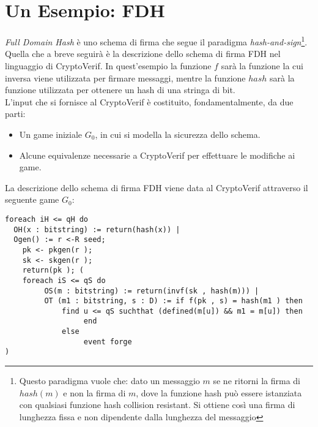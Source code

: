 \documentclass[a4paper,openright,twoside,12pt]{report}
\begin{document}
\section{Un Esempio: FDH}
\emph{Full Domain Hash} \`e uno schema di firma che segue il paradigma \emph{hash-and-sign}\footnote{Questo paradigma vuole che: dato un messaggio $m$ se ne ritorni 
la firma di $hash(m)$ e non la firma di $m$, dove la funzione hash pu\`o essere istanziata con qualsiasi funzione hash collision resistant. 
Si ottiene cos\`i una firma di lunghezza fissa e non dipendente dalla lunghezza del messaggio}. 
Quella che a breve seguir\`a \`e la descrizione dello schema di firma FDH nel linguaggio di CryptoVerif. In quest'esempio la funzione $f$ sar\`a la funzione la cui inversa
viene utilizzata per firmare messaggi, mentre la funzione $hash$ sar\`a la funzione utilizzata per ottenere un hash di una stringa di bit.\\
L'input che si fornisce al CryptoVerif \`e costituito, fondamentalmente, da due parti: 
\begin{itemize}
 \item Un game iniziale $G_0$, in cui si modella la sicurezza dello schema.
 \item Alcune equivalenze necessarie a CryptoVerif per effettuare le modifiche ai game. 
\end{itemize}
La descrizione dello schema di firma FDH viene data al CryptoVerif attraverso il seguente game $G_0$:

\begin{verbatim}
foreach iH <= qH do   
  OH(x : bitstring) := return(hash(x)) |
  Ogen() := r <-R seed;     
    pk <- pkgen(r );    
    sk <- skgen(r );       
    return(pk ); (
    foreach iS <= qS do 
         OS(m : bitstring) := return(invf(sk , hash(m))) |
         OT (m1 : bitstring, s : D) := if f(pk , s) = hash(m1 ) then
             find u <= qS suchthat (defined(m[u]) && m1 = m[u]) then
                  end
             else
                  event forge
)         
\end{verbatim}
\end{document}
